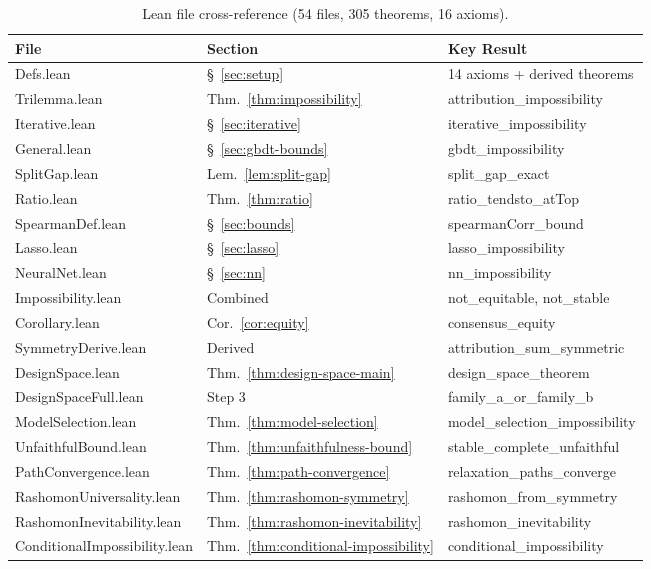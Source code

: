 \documentclass{jmlr}
\begin{document}
\begin{table}[t]
\centering
\caption{Lean file cross-reference (54 files, 305 theorems, 16 axioms).}
\label{tab:lean-crossref}
\scriptsize
\begin{tabular}{@{}p{3.8cm}ll@{}}
\toprule
\textbf{File} & \textbf{Section} & \textbf{Key Result} \\
\midrule
Defs.lean & \S~\ref{sec:setup} & 14 axioms + derived theorems \\
Trilemma.lean & Thm.~\ref{thm:impossibility} & attribution\_impossibility \\
Iterative.lean & \S~\ref{sec:iterative} & iterative\_impossibility \\
General.lean & \S~\ref{sec:gbdt-bounds} & gbdt\_impossibility \\
SplitGap.lean & Lem.~\ref{lem:split-gap} & split\_gap\_exact \\
Ratio.lean & Thm.~\ref{thm:ratio} & ratio\_tendsto\_atTop \\
SpearmanDef.lean & \S~\ref{sec:bounds} & spearmanCorr\_bound \\
Lasso.lean & \S~\ref{sec:lasso} & lasso\_impossibility \\
NeuralNet.lean & \S~\ref{sec:nn} & nn\_impossibility \\
Impossibility.lean & Combined & not\_equitable, not\_stable \\
Corollary.lean & Cor.~\ref{cor:equity} & consensus\_equity \\
SymmetryDerive.lean & Derived & attribution\_sum\_symmetric \\
DesignSpace.lean & Thm.~\ref{thm:design-space-main} & design\_space\_theorem \\
DesignSpaceFull.lean & Step 3 & family\_a\_or\_family\_b \\
ModelSelection.lean & Thm.~\ref{thm:model-selection} & model\_selection\_impossibility \\
UnfaithfulBound.lean & Thm.~\ref{thm:unfaithfulness-bound} & stable\_complete\_unfaithful \\
PathConvergence.lean & Thm.~\ref{thm:path-convergence} & relaxation\_paths\_converge \\
RashomonUniversality.lean & Thm.~\ref{thm:rashomon-symmetry} & rashomon\_from\_symmetry \\
RashomonInevitability.lean & Thm.~\ref{thm:rashomon-inevitability} & rashomon\_inevitability \\
ConditionalImpossibility.lean & Thm.~\ref{thm:conditional-impossibility} & conditional\_impossibility \\

\end{tabular}
\end{table}
\end{document}

